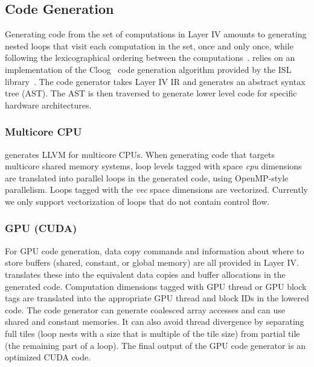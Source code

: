 \vspace{-0.25cm}
\subsection{Code Generation}

Generating code from the set of computations in Layer IV amounts to generating nested loops that visit each computation in the set, once and only once, while following the lexicographical ordering between the computations~\cite{Bas04,Iri88,Qui00}. \framework{} relies on an implementation of the Cloog~\cite{Bas04} code generation algorithm provided by the ISL library~\cite{verdoolaege_isl:_2010}. 
The \framework{} code generator takes Layer IV IR and generates an abstract syntax tree (AST).  The AST is then traversed to generate lower level code for specific hardware architectures.

\vspace{-0.25cm}
\subsubsection{Multicore CPU}

\framework{} generates LLVM for multicore CPUs.  When generating code that targets multicore shared memory systems, loop levels tagged with space \emph{cpu} dimensions are translated into parallel loops in the generated code, using OpenMP-style parallelism.  Loops tagged with the \emph{vec} space dimensions are vectorized.  Currently we only support vectorization of loops that do not contain control flow.

\vspace{-0.25cm}
\subsubsection{GPU (CUDA)}
For GPU code generation, data copy commands and information about where to store buffers (shared, constant, or global memory) are all provided in Layer IV.  \framework{} translates these into the equivalent data copies and buffer allocations in the generated code.  Computation dimensions tagged with GPU thread or GPU block tags are translated into the appropriate GPU thread and block IDs in the lowered code.  The \framework{} code generator can generate coalesced array accesses and can use shared and constant memories. It can also avoid thread divergence by separating full tiles (loop nests with a size that is multiple of the tile size) from partial tile (the remaining part of a loop).
The final output of the GPU code generator is an optimized CUDA code.


